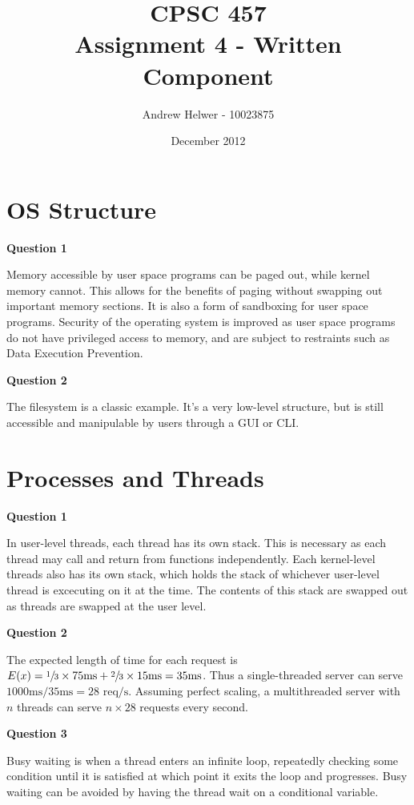 \documentclass[letterpaper]{article}
\begin{document}
\title{CPSC 457 \\ Assignment 4 - Written Component}
\author{Andrew Helwer - 10023875}
\date{December 2012}
\maketitle

\section{OS Structure}

\textbf{Question 1}

Memory accessible by user space programs can be paged out, while kernel memory cannot.
This allows for the benefits of paging without swapping out important memory sections.
It is also a form of sandboxing for user space programs.
Security of the operating system is improved as user space programs do not have privileged access to memory, and are subject to restraints such as Data Execution Prevention.


\textbf{Question 2}

The filesystem is a classic example. 
It's a very low-level structure, but is still accessible and manipulable by users through a GUI or CLI.

\section{Processes and Threads}

\textbf{Question 1}

In user-level threads, each thread has its own stack.
This is necessary as each thread may call and return from functions independently.
Each kernel-level threads also has its own stack, which holds the stack of whichever user-level thread is excecuting on it at the time.
The contents of this stack are swapped out as threads are swapped at the user level.

\textbf{Question 2}

The expected length of time for each request is $E(x) = \sfrac{1}{3} \times 75 \text{ms} + \sfrac{2}{3} \times 15 \text{ms} = 35 \text{ms}$.
Thus a single-threaded server can serve $1000 \text{ms} / 35 \text{ms} = 28 \text{ req/s}$.
Assuming perfect scaling, a multithreaded server with $n$ threads can serve $n \times 28$ requests every second.

\textbf{Question 3}

Busy waiting is when a thread enters an infinite loop, repeatedly checking some condition until it is satisfied at which point it exits the loop and progresses.
Busy waiting can be avoided by having the thread wait on a conditional variable.
\end{document}
